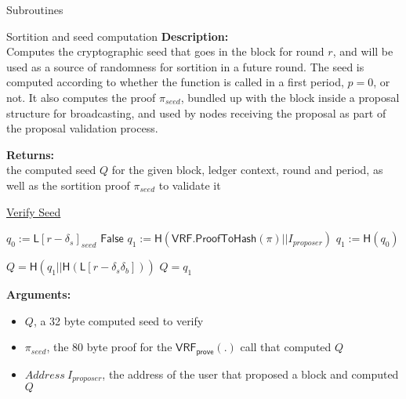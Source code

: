 \documentclass[10pt,a4paper]{article}
\begin{document}
\begin{section}{Subroutines}
\begin{subsection}{Sortition and seed computation}
\noindent \textbf{Description:}\\ Computes the cryptographic seed that goes in the block for round $r$,
and will be used as a source of randomness for sortition in a future round.
The seed is computed according to whether the function is called in a first period, $p = 0$, or not.
It also computes the proof $\pi_{seed}$, bundled up with the block inside a proposal structure for broadcasting, 
and used by nodes receiving the proposal as part of the proposal validation process.


\noindent \textbf{Returns:} \\
    the computed seed $Q$ for the given block, ledger context, round and period, as well as the sortition proof $\pi_{seed}$
    to validate it


\begin{algorithm}[H]
    \caption{\underline{Verify Seed}}
    \label{algo:verify-seed}
    \begin{algorithmic}[1]
        \State $q_0 := \mathsf{L}[r-\delta_s]_{seed}$
                    \Return $\mathsf{False}$
                \EndIf
                \State $q_1 := \mathsf{H}(\mathsf{VRF.ProofToHash}(\pi)||I_{proposer})$
            \Else
                \State $q_1 := \mathsf{H}(q_0)$
            \EndIf


            \State \Return $Q = \mathsf{H}(q_1||\mathsf{H}(\mathsf{L}[r-\delta_s\delta_b]))$
        \Else
            \State \Return $Q = q_1$
        \EndIf
    \EndFunction
    \end{algorithmic}
\end{algorithm}


\noindent \textbf{Arguments:}
\begin{itemize}
    \item $Q$, a 32 byte computed seed to verify
    \item $\pi_{seed}$, the 80 byte proof for the $\mathsf{VRF_{prove}}(.)$ call that computed $Q$
    \item $Address \ I_{proposer}$, the address of the user that proposed a block and computed $Q$
  \end{itemize}



\end{subsection}
\end{section}
\end{document}
